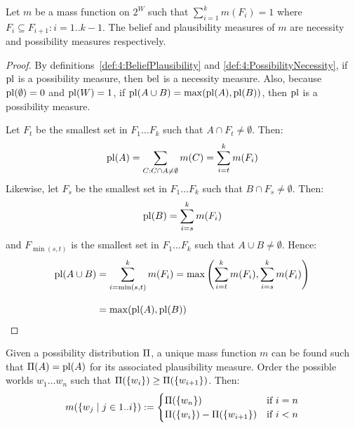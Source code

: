 \begin{thm}
  \label{thm:4:RelationToDempsterShafer}
  Let $m$ be a mass function on $2^W$ such that $\sum_{i = 1}^k m(F_i) = 1$ where
  $F_i \subseteq F_{i + 1} : i = 1 .. k - 1$.
  The belief and plausibility measures of $m$ are necessity and possibility
  measures respectively.
  \begin{proof}
    By definitions~\ref{def:4:BeliefPlausibility} and
    \ref{def:4:PossibilityNecessity}, if $\operatorname*{pl}$ is a possibility measure, then
    $\operatorname*{bel}$ is a necessity measure.
    Also, because $\operatorname*{pl}(\emptyset) = 0$ and $\operatorname*{pl}(W) = 1$, if $\operatorname*{pl}(A \cup B) =
      \max(\operatorname*{pl}(A), \operatorname*{pl}(B))$, then $\operatorname*{pl}$ is a possibility measure.

    Let $F_t$ be the smallest set in $F_1 \ldots F_k$ such that $A \cap F_t \neq
      \emptyset$.
    Then:
    \begin{equation*}
      \operatorname*{pl}(A) = \sum_{C : C \cap A \neq \emptyset} m(C) = \sum_{i = t}^k m(F_i)
    \end{equation*}
    Likewise, let $F_s$ be the smallest set in $F_1 \ldots F_k$ such that $B \cap
      F_s \neq \emptyset$.
    Then:
    \begin{equation*}
      \operatorname*{pl}(B) = \sum_{i = s}^k m(F_i)
    \end{equation*}
    and $F_{\min(s, t)}$ is the smallest set in $F_1 \ldots F_k$
    such that $A \cup B \neq \emptyset$.
    Hence:
    \begin{align*}
      \operatorname*{pl}(A \cup B)
       & = \sum_{i = \min(s, t)}^k m(F_i)
      = \max\left(\sum_{i = t}^k m(F_i), \sum_{i = s}^k m(F_i)\right)
      \\[2ex]
       & = \max(\operatorname*{pl}(A), \operatorname*{pl}(B))
    \end{align*}
  \end{proof}
\end{thm}

Given a possibility distribution $\operatorname*{\Pi}$, a unique mass function $m$ can be
found such that $\operatorname*{\Pi}(A) = \operatorname*{pl}(A)$ for its associated plausibility measure.
Order the possible worlds $w_1 \ldots w_n$ such that $\operatorname*{\Pi}(\{w_i\}) \geq
  \operatorname*{\Pi}(\{w_{i + 1}\})$.
Then:
\begin{equation*}
  m(\{w_j \mid j \in 1 .. i \}) :=
  \begin{cases}
    \operatorname*{\Pi}(\{w_n\})                        & \text{if } i = n
    \\
    \operatorname*{\Pi}(\{w_i\}) - \operatorname*{\Pi}(\{w_{i + 1}\}) & \text{if } i < n
  \end{cases}
\end{equation*}
